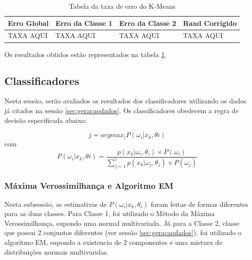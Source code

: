 \begin{table}[H]
\begin{center}
\begin{tabular}{|l|l|l|l|}
\hline
Erro Global	&	Erro da Classe 1	&	Erro da Classe 2	&	Rand Corrigido	\\
\hline %
TAXA AQUI	&		TAXA AQUI		&		TAXA AQUI		&	TAXA AQUI		\\
\hline
\end{tabular}%
\end{center}   %
\caption{Tabela da taxa de erro do K-Means}
\label{tab:erro-kmeans}
\end{table}

Os resultados obtidos estão representados na tabela \ref{tab:erro-kmeans}.


\subsection{Classificadores}
\label{subsec:exp-classificadores}

Nesta sessão, serão avaliados os resultados dos classificadores utilizando os dados já citados na sessão \ref{sec:geracaodados}. Os classificadores obedecem a regra de decisão especificada abaixo:

\begin{equation}
j = argmax_i P(\omega_{i} | x_{k},\theta{i})
\end{equation}
com
\begin{equation}
P(\omega_{i} | x_{k},\theta{i}) = \dfrac{p(x_k| \omega_i, \theta_i) \times P(\omega_i)}{\sum_{j=1}^c p(x_k | \omega_j, \theta_j) \times P(\omega_j)}
\end{equation}


\subsubsection{Máxima Verossimilhança e Algoritmo EM}
\label{subsubsec:exp-mle-em}

Nesta subsessão, as estimativas de $P(\omega_i | x_k, \theta_i)$ foram feitas de formas diferentes para as duas classes. Para Classe 1, foi utilizado o Método da Máxima Verossimilhança, supondo uma normal multivariada. Já para a Classe 2, classe que possui 2 conjuntos diferentes (ver sessão \ref{sec:geracaodados}), foi utilizado o algoritmo EM, supondo a existencia de 2 componentes e uma mistura de distribuições normais multivaridas.

